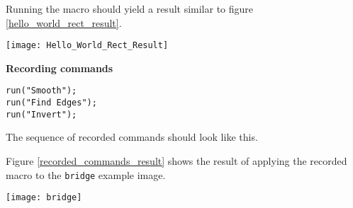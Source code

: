 \begin{ExerciseList}
Running the macro should yield a result similar to figure \ref{hello_world_rect_result}.

\begin{center}
    \texttt{[image: Hello\_World\_Rect\_Result]}
    \label{hello_world_rect_result}
\end{center}

\Answer[ref={ex_2_4}]

{\bf Recording commands}

\begin{listing}[H]
\begin{verbatim}
run("Smooth");
run("Find Edges");
run("Invert");
\end{verbatim}
\caption{The sequence of recorded commands should look like this.}
\label{lst:recorded_commands}
\end{listing}

Figure \ref{recorded_commands_result} shows the result of applying the recorded macro to the {\tt bridge} example image.

\begin{center}
    \texttt{[image: bridge]}
    \label{recorded_commands_result}
\end{center}

\end{ExerciseList}


